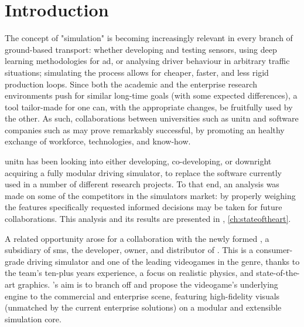 \chapter*{Introduction}\label{ch:introduction}

The concept of "simulation" is becoming increasingly relevant in every branch of ground-based transport: whether developing and testing sensors, using deep learning methodologies for \gls{ad}, or analysing driver behaviour in arbitrary traffic situations; simulating the process allows for cheaper, faster, and less rigid production loops. Since both the academic and the enterprise research environments push for similar long-time goals (with some expected differences), a tool tailor-made for one can, with the appropriate changes, be fruitfully used by the other. As such, collaborations between universities such as \gls{unitn} and software companies such as  may prove remarkably successful, by promoting an healthy exchange of workforce, technologies, and know-how.

\gls{unitn} has been looking into either developing, co-developing, or downright acquiring a fully modular driving simulator, to replace the software currently used in a number of different research projects. To that end, an analysis was made on some of the competitors in the simulators market: by properly weighing the \glspl{feature} specifically requested informed decisions may be taken for future collaborations. This analysis and its results are presented in , \cref{ch:stateoftheart}.

A related opportunity arose for a collaboration with the newly formed , a subsidiary of \gls{sms}, the developer, owner, and distributor of . This is a consumer-grade driving simulator and one of the leading videogames in the genre, thanks to the team's ten-plus years experience, a focus on realistic physics, and state-of-the-art graphics. 's aim is to branch off and propose the videogame's underlying engine to the commercial and enterprise scene, featuring high-fidelity visuals (unmatched by the current enterprise solutions) on a modular and extensible simulation core.

